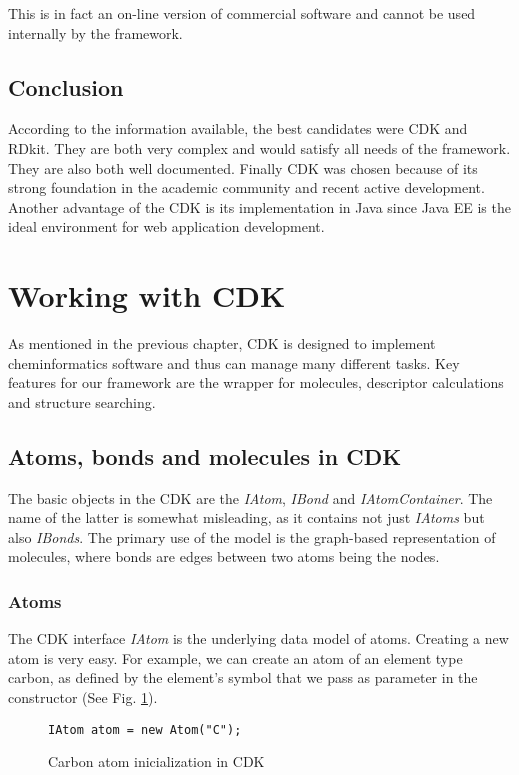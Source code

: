 \documentclass[thesis=M,english]{FITthesis}[2012/10/20]
\begin{document}
This is in fact an on-line version of commercial software and cannot be used internally by the framework.

\subsection{Conclusion}
According to the information available, the best candidates were CDK and RDkit. They are both very complex and would satisfy all needs of the framework. They are also both well documented. Finally CDK was chosen because of its strong foundation in the academic community and recent active development. Another advantage of the CDK is its implementation in Java since Java EE is the ideal environment for web application development.


\section{Working with CDK}
As mentioned in the previous chapter, CDK is designed to implement cheminformatics software and thus can manage many different tasks. Key features for our framework are the wrapper for molecules, descriptor calculations and structure searching.

\subsection{Atoms, bonds and molecules in CDK}
The basic objects in the CDK are the \textit{IAtom}, \textit{IBond} and \textit{IAtomContainer}. The name of the latter is somewhat misleading, as it contains not just \textit{IAtoms} but also \textit{IBonds}. The primary use of the model is the graph-based representation of molecules, where bonds are edges between two atoms being the nodes.\cite{cdk}

\subsubsection{Atoms}
The CDK interface \textit{IAtom} is the underlying data model of atoms. Creating a new atom is very easy. For example, we can create an atom of an element type carbon, as defined by the element's symbol that we pass as parameter in the constructor (See Fig. \ref{cdkAtomCode}).

\begin{figure}
\begin{lstlisting}
IAtom atom = new Atom("C");
\end{lstlisting}
\caption{Carbon atom inicialization in CDK}
\label{cdkAtomCode}
\end{figure}
\end{document}

